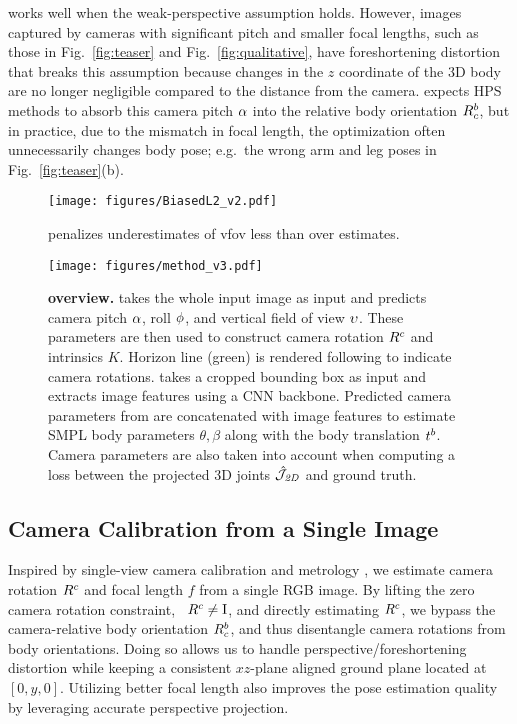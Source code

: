 \documentclass[10pt,twocolumn,letterpaper,usenames,dvipsnames]{article}
\begin{document}
\iwcam works well when the weak-perspective assumption holds. However, images captured by cameras with significant pitch and smaller focal lengths, such as those in Fig.~\ref{fig:teaser} and Fig.~\ref{fig:qualitative}, 
have foreshortening distortion that breaks this assumption because changes in the $z$ coordinate of the 3D body are no longer negligible compared to the distance from the camera.  
\iwcam expects HPS methods to absorb this camera pitch $\alpha$ into the relative body orientation $R^b_c$, but in practice, due to the mismatch in focal length, the optimization often unnecessarily changes body pose; e.g.~the wrong arm and leg poses in Fig.~\ref{fig:teaser}(b). 


\begin{SCfigure}
    \centering
    \texttt{[image: figures/BiasedL2\_v2.pdf]}
    \caption{\softbiasedltwo penalizes underestimates of vfov less than over estimates. }\label{fig:biased-L2}
    \vspace{-2ex}
\end{SCfigure}

\begin{figure*}[t]
    \centering
    \texttt{[image: figures/method\_v3.pdf]}
    \caption{\textbf{\methodname overview.} \camcalib takes the whole input image as input and predicts camera pitch $\alpha$, roll $\phi$, and vertical field of view $\upsilon$. These parameters are then used to construct camera rotation $R^c$ and intrinsics $K$. Horizon line (green) is rendered following \cite{zhu2020single} to indicate camera rotations. \methodname takes a cropped bounding box as input and extracts image features using a CNN backbone. Predicted camera parameters from \camcalib are concatenated with image features to estimate SMPL body parameters $\theta,\beta$ along with the body translation $t^b$. Camera parameters are also taken into account when computing a loss between the projected 3D joints $\hat{\mathcal{J}}_{\mathit{2D}}$ and ground truth.} 
\label{fig:model_spec}
    \vspace{-2ex}
\end{figure*}{}
\subsection{Camera Calibration from a Single Image}
\label{cam_calib}


Inspired by single-view camera calibration and metrology \cite{Hold-Geoffroy_2018_CVPR,Kendall_2015_ICCV,workman2016horizon,zhu2020single}, we estimate camera rotation $R^c$ and focal length $f$ from a single RGB image.
By lifting the zero camera rotation constraint, \ie~$R^c \neq \text{I}$, and directly estimating $R^c$, we bypass the camera-relative body orientation $R^b_c$, and thus disentangle camera rotations from body orientations.
Doing so allows us to handle perspective/foreshortening distortion 
while keeping a consistent $xz$-plane aligned ground plane located at $[0, y, 0]$.
Utilizing better focal length also improves the pose estimation quality by leveraging accurate perspective projection. 
\end{document}
